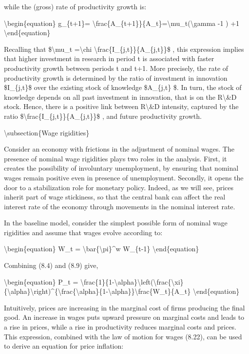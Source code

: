 \documentclass[10pt,math=newtx,citestyle=gb7714-2015,bibstyle=gb7714-2015]{elegantbook}
\begin{document}
	while the (gross) rate of productivity growth is:
	
	\textbackslash{}begin\{equation\}
	g\_\{t+1\}= \textbackslash{}frac\{A\_\{t+1\}\}\{A\_t\}=\textbackslash{}mu\_t(\textbackslash{}gamma -1 ) +1
	\textbackslash{}end\{equation\}
	
	Recalling that \$\textbackslash{}mu\_t =\textbackslash{}chi \textbackslash{}frac\{I\_\{j,t\}\}\{A\_\{j,t\}\}\$ , this expression implies that higher investment in research in period t is associated with faster productivity growth between periods t and t+1. More precisely, the rate of productivity growth is determined by the ratio of investment in innovation \$I\_\{j,t\}\$ over the existing stock of knowledge \$A\_\{j,t\} \$. In turn, the stock of knowledge depends on all past investment in innovation, that is on the R\textbackslash{}\&D stock. Hence, there is a positive link between R\textbackslash{}\&D intensity, captured by the ratio \$\textbackslash{}frac\{I\_\{j,t\}\}\{A\_\{j,t\}\}\$ , and future productivity growth.
	
	\textbackslash{}subsection\{Wage rigidities\}
	
	Consider an economy with frictions in the adjustment of nominal wages. The presence of nominal wage rigidities plays two roles in the analysis. First, it creates the possibility of involuntary unemployment, by ensuring that nominal wages remain positive even in presence of unemployment. Secondly, it opens the door to a stabilization role for monetary policy. Indeed, as we will see, prices inherit part of wage stickiness, so that the central bank can affect the real interest rate of the economy through movements in the nominal interest rate.
	
	In the baseline model, consider the simplest possible form of nominal wage rigidities and assume that wages evolve according to:
	
	\textbackslash{}begin\{equation\}
	W\_t = \textbackslash{}bar\{\textbackslash{}pi\}\^{}w W\_\{t-1\}
	\textbackslash{}end\{equation\}
	
	Combining (8.4) and (8.9) give, 
	
	\textbackslash{}begin\{equation\}
	P\_t = \textbackslash{}frac\{1\}\{1-\textbackslash{}alpha\}\textbackslash{}left(\textbackslash{}frac\{\textbackslash{}xi\}\{\textbackslash{}alpha\}\textbackslash{}right)\^{}\{\textbackslash{}frac\{\textbackslash{}alpha\}\{1-\textbackslash{}alpha\}\}\textbackslash{}frac\{W\_t\}\{A\_t\}
	\textbackslash{}end\{equation\}
	
	Intuitively, prices are increasing in the marginal cost of firms producing the final good. An increase in wages puts upward pressure on marginal costs and leads to a rise in prices, while a rise in productivity reduces marginal costs and prices. This expression, combined with the law of motion for wages (8.22), can be used to derive an equation for price inflation:	
	
\end{document}
